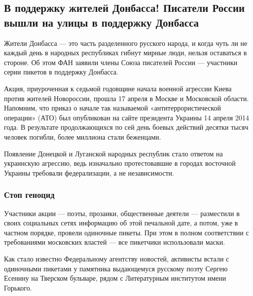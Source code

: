  
 
 
 
 
\subsection{В поддержку жителей Донбасса! Писатели России вышли на улицы в поддержку Донбасса}
\label{sec:20_04_2021.fb.respublikalnr.4.podderzhka_zhiteli_donbass_rossia}

Жители Донбасса — это часть разделенного русского народа, и когда чуть ли не
каждый день в народных республиках гибнут мирные люди, нельзя оставаться в
стороне. Об этом ФАН заявили члены Союза писателей России — участники серии
пикетов в поддержку Донбасса.

Акция, приуроченная к седьмой годовщине начала военной агрессии Киева против
жителей Новороссии, прошла 17 апреля в Москве и Московской области. Напомним,
что приказ о начале так называемой «антитеррористической операции» (АТО) был
опубликован на сайте президента Украины 14 апреля 2014 года. В результате
продолжающихся по сей день боевых действий десятки тысяч человек погибли, более
миллиона стали беженцами.

Появление Донецкой и Луганской народных республик стало ответом на украинскую
агрессию, ведь изначально протестовавшие в городах восточной Украины требовали
федерализации, а не независимости.

\subsubsection{Стоп геноцид}

Участники акции — поэты, прозаики, общественные деятели — разместили в своих
социальных сетях информацию об этой печальной дате, а потом, уже в частном
порядке, провели одиночные пикеты. При этом в полном соответствии с
требованиями московских властей — все пикетчики использовали маски.

Как стало известно Федеральному агентству новостей, активисты встали с
одиночными пикетами у памятника выдающемуся русскому поэту Сергею Есенину на
Тверском бульваре, рядом с Литературным институтом имени Горького.

